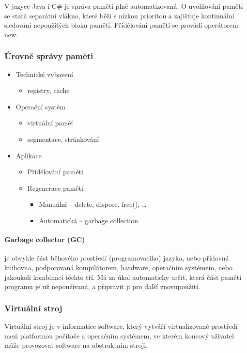 \documentclass[10pt,a4paper]{article}
\begin{document}
V jazyce Java i C\# je správa paměti plně automatizovaná. O uvolňování paměti se stará separátní vlákno, které běží s nízkou prioritou a zajišťuje kontinuální sledování nepoužitých bloků paměti. Přidělování paměti se provádí operátorem new.

\subsubsection{Úrovně správy paměti}

\begin{itemize}
\item Technické vybavení
\begin{itemize}
\item registry, cache
\end{itemize}
\item Operační systém
\begin{itemize}
\item virtuální paměť
\item segmentace, stránkování
\end{itemize}
\item Aplikace
\begin{itemize}
\item Přidělování paměti
\item Regenerace paměti
\begin{itemize}
\item Manuální – delete, dispose, free(), …
\item Automatická – garbage collection
\end{itemize}
\end{itemize}
\end{itemize}
\paragraph{Garbage collector (GC)} je obvykle část běhového prostředí (programovacího) jazyka, nebo přídavná knihovna, podporovaná kompilátorem, hardware, operačním systémem, nebo jakoukoli kombinací těchto tří. Má za úkol automaticky určit, která část paměti programu je už nepoužívaná, a připravit ji pro další znovupoužití.
\subsubsection{Virtuální stroj}
Virtuální stroj je v informatice software, který vytváří virtualizované prostředí mezi platformou počítače a operačním systémem, ve kterém koncový uživatel může provozovat software na abstraktním stroji.
\end{document}
